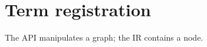 \documentclass[EN,glossary,no-cover,no-toc]{P3CTeX}
\begin{document}
\section{Term registration}
The \gls{API} manipulates a \gls{graph}; the \gls{IR} contains a \gls{node}.
\pxPrintGlossary[type=acronym]
\pxPrintGlossaries
\end{document}
